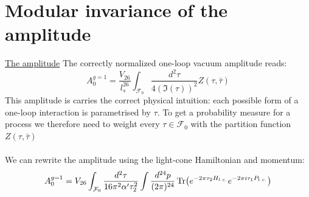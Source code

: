 \documentclass[11pt,aspectratio=169]{beamer}
\begin{document}






\section{Modular invariance of the amplitude}

\begin{frame}{\underline{The amplitude}}
	The correctly normalized one-loop vacuum amplitude reads:
	\begin{equation}
		A_0^{g=1} = \frac{V_{26}}{l_s^{26}}\int_{\mathcal{F}_0}\frac{d^2\tau}{4(\Im(\tau))^2}Z(\tau, \bar{\tau})
	\end{equation}
	This amplitude is carries the correct physical intuition: each possible form of a one-loop interaction is parametrised by $\tau$.
	To get a probability measure for a process we therefore need to weight every $\tau \in \mathcal{F}_0$ with the partition function $Z(\tau, \bar{\tau})$
	\\~\\
	We can rewrite the amplitude using the light-cone Hamiltonian and momentum:
	\begin{equation}
		A_0^{g=1} = V_{26} \int_{\mathcal{F}_0} \frac{d^2\tau}{16\pi^2\alpha'\tau_2^2} \int \frac{d^{24}p}{(2\pi)^{24}}\Tr(e^{-2\pi \tau_2 H_{l.c.}}e^{-2\pi i \tau_1 P_{l.c.}})
	\end{equation}
\end{frame}
\end{document}
